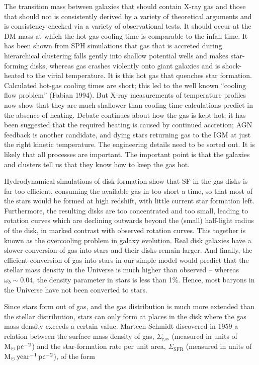 \documentclass[a4paper,11pt]{article}
\begin{document}
{\noindent}The transition mass between galaxies that should contain X-ray gas and those that should not is consistently derived by a variety of theoretical arguments and is consistency checked via a variety of observational tests. It should occur at the DM mass at which the hot gas cooling time is comparable to the infall time. It has been shown from SPH simulations that gas that is accreted during hierarchical clustering falls gently into shallow potential wells and makes star-forming disks, whereas gas crashes violently onto giant galaxies and is shock-heated to the virial temperature. It is this hot gas that quenches star formation. Calculated hot-gas cooling times are short; this led to the well known ``cooling flow problem'' (Fabian 1994). But X-ray measurements of temperature profiles now show that they are much shallower than cooling-time calculations predict in the absence of heating. Debate continues about how the gas is kept hot; it has been suggested that the required heating is caused by continued accretion; AGN feedback is another candidate, and dying stars returning gas to the IGM at just the right kinetic temperature. The engineering details need to be sorted out. It is likely that all processes are important. The important point is that the galaxies and clusters tell us that they know how to keep the gas hot.

{\noindent}Hydrodynamical simulations of disk formation show that SF in the gas disks is far too efficient, consuming the available gas in too short a time, so that most of the stars would be formed at high redshift, with little current star formation left. Furthermore, the resulting disks are too concentrated and too small, leading to rotation curves which are declining outwards beyond the (small) half-light radius of the disk, in marked contrast with observed rotation curves. This together is known as the overcooling problem in galaxy evolution. Real disk galaxies have a slower conversion of gas into stars and their disks remain larger. And finally, the efficient conversion of gas into stars in our simple model would predict that the stellar mass density in the Universe is much higher than observed -- whereas $\omega_b\sim0.04$, the density parameter in stars is less than 1\%. Hence, most baryons in the Universe have not been converted to stars.

{\noindent}Since stars form out of gas, and the gas distribution is much more extended than the stellar distribution, stars can only form at places in the disk where the gas mass density exceeds a certain value. Marteen Schmidt discovered in 1959 a relation between the surface mass density of gas, $\Sigma_\mathrm{gas}$ (measured in units of ${\rm M_\odot\,pc^{-2}}$) and the star-formation rate per unit area, $\Sigma_\mathrm{SFR}$ (measured in units of ${\rm M_\odot\,year^{-1}\,pc^{-2}}$), of the form
\end{document}
